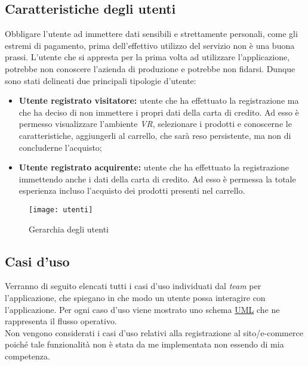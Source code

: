 \subsection{Caratteristiche degli utenti}

Obbligare l'utente ad immettere dati sensibili e strettamente personali, come gli estremi di pagamento, prima dell'effettivo utilizzo del servizio non è una buona prassi. L'utente che si appresta per la prima volta ad utilizzare l'applicazione, potrebbe non conoscere l'azienda di produzione e potrebbe non fidarsi. Dunque sono stati delineati due principali tipologie d'utente:

\begin{itemize}
	\item \textbf{Utente registrato visitatore:} utente che ha effettuato la registrazione ma che ha deciso di non immettere i propri dati della carta di credito. Ad esso è permesso visualizzare l'ambiente \textit{VR}, selezionare i prodotti e conoscerne le caratteristiche, aggiungerli al carrello, che sarà reso persistente, ma non di concluderne l'acquisto;
	\item \textbf{Utente registrato acquirente:} utente che ha effettuato la registrazione immettendo anche i dati della carta di credito. Ad esso è permessa la totale esperienza incluso l'acquisto dei prodotti presenti nel carrello.
\end{itemize}

\label{Gerarchia utenti}
\begin{figure}[ht]
	\begin{center}
		\texttt{[image: utenti]}
		\caption{Gerarchia degli utenti}
	\end{center}
\end{figure}
\FloatBarrier

\subsection{Casi d'uso}

Verranno di seguito elencati tutti i casi d'uso individuati dal \textit{team} per l'applicazione, che spiegano in che modo un utente possa interagire con l'applicazione. Per ogni caso d'uso viene mostrato uno schema \hyperlink{uml}{UML} che ne rappresenta il flusso operativo. \\ Non vengono considerati i casi d'uso relativi alla registrazione al sito/e-commerce poiché tale funzionalità non è stata da me implementata non essendo di mia competenza.

